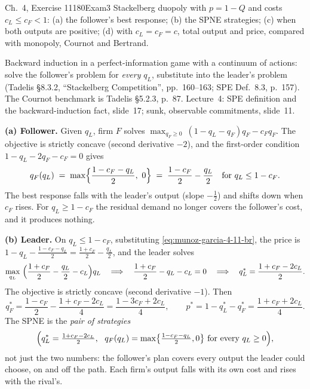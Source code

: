 \begin{exsol}{\MG{} Ch.~4, Exercise 11}{180}{Exam}{3}
\asked Stackelberg duopoly with $p = 1-Q$ and costs $c_L \le c_F < 1$: (a) the follower's best
response; (b) the SPNE strategies; (c) when both outputs are positive; (d) with $c_L = c_F = c$,
total output and price, compared with monopoly, Cournot and Bertrand.

\method Backward induction in a perfect-information game with a continuum of actions: solve the
follower's problem for \emph{every} $q_L$, substitute into the leader's problem (Tadelis \S8.3.2,
``Stackelberg Competition'', pp.~160--163; SPE Def.~8.3, p.~157). The Cournot benchmark is Tadelis
\S5.2.3, p.~87. Lecture~4: SPE definition and the backward-induction fact, slide~17; sunk,
observable commitments, slide~11.

\solution
\textbf{(a) Follower.} Given $q_L$, firm $F$ solves $\max_{q_F\ge0}\ (1 - q_L - q_F)q_F - c_Fq_F$.
The objective is strictly concave (second derivative $-2$), and the first-order condition
$1 - q_L - 2q_F - c_F = 0$ gives
\begin{equation}
  q_F(q_L) \;=\; \max\Bigl\{\frac{1 - c_F - q_L}{2},\ 0\Bigr\}
  \;=\; \frac{1-c_F}{2} - \frac{q_L}{2} \quad\text{for } q_L \le 1 - c_F .
  \label{eq:munoz-garcia-4-11-br}
\end{equation}
The best response falls with the leader's output (slope $-\frac12$) and shifts down when $c_F$
rises. For $q_L \ge 1 - c_F$ the residual demand no longer covers the follower's cost, and it
produces nothing.

\textbf{(b) Leader.} On $q_L \le 1-c_F$, substituting \eqref{eq:munoz-garcia-4-11-br}, the price is
$1 - q_L - \frac{1-c_F-q_L}{2} = \frac{1+c_F}{2} - \frac{q_L}{2}$, and the leader solves
\[
  \max_{q_L}\ \Bigl(\frac{1+c_F}{2} - \frac{q_L}{2} - c_L\Bigr)q_L
  \quad\Longrightarrow\quad \frac{1+c_F}{2} - q_L - c_L = 0
  \quad\Longrightarrow\quad q_L^* = \frac{1 + c_F - 2c_L}{2}.
\]
The objective is strictly concave (second derivative $-1$). Then
\[
  q_F^* = \frac{1-c_F}{2} - \frac{1+c_F-2c_L}{4} = \frac{1 - 3c_F + 2c_L}{4},
  \qquad p^* = 1 - q_L^* - q_F^* = \frac{1 + c_F + 2c_L}{4}.
\]
The SPNE is the \emph{pair of strategies}
\[
  \Bigl(q_L^* = \tfrac{1+c_F-2c_L}{2},\ \ q_F(q_L) = \max\bigl\{\tfrac{1-c_F-q_L}{2}, 0\bigr\}
  \text{ for every } q_L \ge 0\Bigr),
\]
not just the two numbers: the follower's plan covers every output the leader could choose, on and
off the path. Each firm's output falls with its own cost and rises with the rival's.


\end{exsol}
